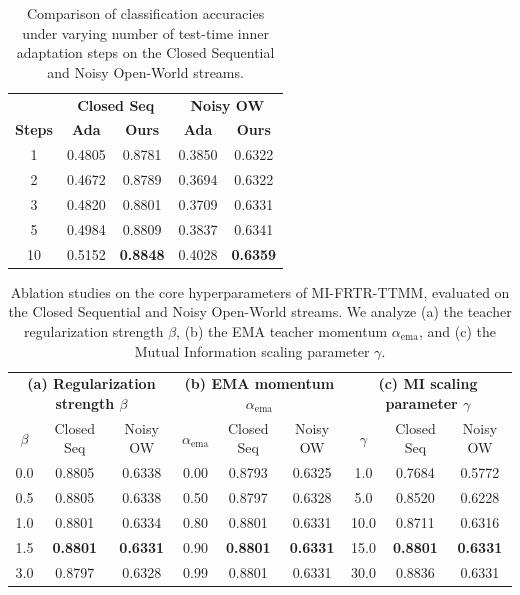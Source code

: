 \documentclass{article}
\theoremstyle{plain}
\theoremstyle{definition}
\theoremstyle{remark}
\begin{document}
\begin{table}[h]
\caption{Comparison of classification accuracies under varying number of test-time inner adaptation steps on the Closed Sequential and Noisy Open-World streams.}
\label{tab:inner_steps}
\centering
\begin{small}
\begin{sc}
\begin{tabular}{ccccc}
\toprule
& \multicolumn{2}{c}{\textbf{Closed Seq}} & \multicolumn{2}{c}{\textbf{Noisy OW}} \\
\textbf{Steps} & \textbf{Ada} & \textbf{Ours} & \textbf{Ada} & \textbf{Ours} \\
\midrule
1  & 0.4805 & 0.8781 & 0.3850 & 0.6322 \\
2  & 0.4672 & 0.8789 & 0.3694 & 0.6322 \\
3  & 0.4820 & 0.8801 & 0.3709 & 0.6331 \\
5  & 0.4984 & 0.8809 & 0.3837 & 0.6341 \\
10 & 0.5152 & \textbf{0.8848} & 0.4028 & \textbf{0.6359} \\
\bottomrule
\end{tabular}
\end{sc}
\end{small}
\vspace{-10pt}
\end{table}

\begin{table}[t]
\caption{Ablation studies on the core hyperparameters of MI-FRTR-TTMM, evaluated on the Closed Sequential and Noisy Open-World streams. We analyze (a) the teacher regularization strength $\beta$, (b) the EMA teacher momentum $\alpha_{\text{ema}}$, and (c) the Mutual Information scaling parameter $\gamma$.}
\label{tab:ablations}
\centering
\begin{small}
\begin{sc}
\begin{tabular}{ccc|ccc|ccc}
\toprule
\multicolumn{3}{c}{\textbf{(a) Regularization strength $\beta$}} & \multicolumn{3}{c}{\textbf{(b) EMA momentum $\alpha_{\text{ema}}$}} & \multicolumn{3}{c}{\textbf{(c) MI scaling parameter $\gamma$}} \\
$\beta$ & Closed Seq & Noisy OW & $\alpha_{\text{ema}}$ & Closed Seq & Noisy OW & $\gamma$ & Closed Seq & Noisy OW \\
\midrule
0.0 & 0.8805 & 0.6338 & 0.00 & 0.8793 & 0.6325 &  1.0 & 0.7684 & 0.5772 \\
0.5 & 0.8805 & 0.6338 & 0.50 & 0.8797 & 0.6328 &  5.0 & 0.8520 & 0.6228 \\
1.0 & 0.8801 & 0.6334 & 0.80 & 0.8801 & 0.6331 & 10.0 & 0.8711 & 0.6316 \\
1.5 & \textbf{0.8801} & \textbf{0.6331} & 0.90 & \textbf{0.8801} & \textbf{0.6331} & 15.0 & \textbf{0.8801} & \textbf{0.6331} \\
3.0 & 0.8797 & 0.6328 & 0.99 & 0.8801 & 0.6331 & 30.0 & 0.8836 & 0.6331 \\
\bottomrule
\end{tabular}
\end{sc}
\end{small}
\vspace{-10pt}
\end{table}
\end{document}
